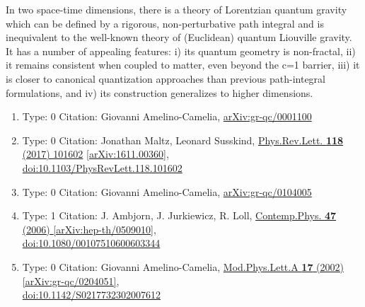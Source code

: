 \documentclass[a4paper,10pt]{article}
\begin{document}
\begin{enumerate}
In two space-time dimensions, there is a theory of Lorentzian quantum gravity which can be defined by a rigorous, non-perturbative path integral and is inequivalent to the well-known theory of (Euclidean) quantum Liouville gravity. It has a number of appealing features: i) its quantum geometry is non-fractal, ii) it remains consistent when coupled to matter, even beyond the c=1 barrier, iii) it is closer to canonical quantization approaches than previous path-integral formulations, and iv) its construction generalizes to higher dimensions.
\begin{enumerate}
  \item Type: 0 Citation: Giovanni Amelino-Camelia, \href{https://arxiv.org/abs/gr-qc/0001100}{arXiv:gr-qc/0001100}
  \item Type: 0 Citation: Jonathan Maltz, Leonard Susskind, \href{https://www.doi.org/10.1103/PhysRevLett.118.101602}{Phys.Rev.Lett. {\bf 118} (2017) 101602}  \href{https://arxiv.org/abs/1611.00360}{[arXiv:1611.00360]},\\\href{https://www.doi.org/10.1103/PhysRevLett.118.101602}{doi:10.1103/PhysRevLett.118.101602}
  \item Type: 0 Citation: Giovanni Amelino-Camelia, \href{https://arxiv.org/abs/gr-qc/0104005}{arXiv:gr-qc/0104005}
  \item Type: 1 Citation: J. Ambjorn, J. Jurkiewicz, R. Loll, \href{https://www.doi.org/10.1080/00107510600603344}{Contemp.Phys. {\bf 47} (2006) }  \href{https://arxiv.org/abs/hep-th/0509010}{[arXiv:hep-th/0509010]},\\\href{https://www.doi.org/10.1080/00107510600603344}{doi:10.1080/00107510600603344}
  \item Type: 0 Citation: Giovanni Amelino-Camelia, \href{https://www.doi.org/10.1142/S0217732302007612}{Mod.Phys.Lett.A {\bf 17} (2002) }  \href{https://arxiv.org/abs/gr-qc/0204051}{[arXiv:gr-qc/0204051]},\\\href{https://www.doi.org/10.1142/S0217732302007612}{doi:10.1142/S0217732302007612}

\end{enumerate}
\end{enumerate}
\end{document}
